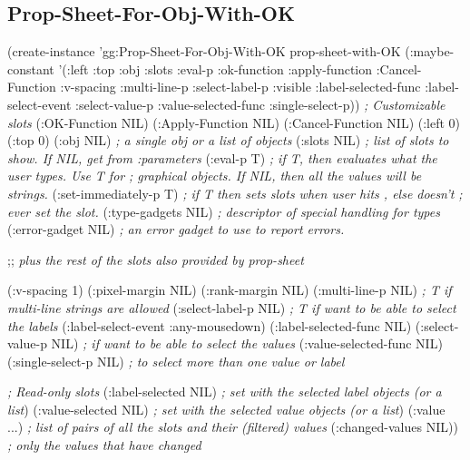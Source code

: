 \begin{group}
\subsection{Prop-Sheet-For-Obj-With-OK}
\label{propsheetforobjwithok}

\begin{programexample}
(create-instance 'gg:Prop-Sheet-For-Obj-With-OK prop-sheet-with-OK
    (:maybe-constant '(:left :top :obj :slots :eval-p :ok-function
		       :apply-function :Cancel-Function :v-spacing
		       :multi-line-p :select-label-p :visible
		       :label-selected-func :label-select-event
		       :select-value-p :value-selected-func :single-select-p))
   {\it ; Customizable slots}
    (:OK-Function NIL)
    (:Apply-Function NIL)
    (:Cancel-Function NIL)
    (:left 0) (:top 0)
    (:obj NIL)   {\it ; a single obj or a list of objects}
    (:slots NIL) {\it ; list of slots to show. If NIL, get from :parameters}
    (:eval-p T)  {\it ; if T, then evaluates what the user types.  Use T for}
		 {\it ; graphical objects.  If NIL, then all the values will be strings.}
    (:set-immediately-p T) {\it ; if T then sets slots when user hits , else doesn't}
			   {\it ; ever set the slot.}
    (:type-gadgets NIL) {\it ; descriptor of special handling for types}
    (:error-gadget NIL) {\it ; an error gadget to use to report errors.}

    ;; {\it plus the rest of the slots also provided by prop-sheet}

    (:v-spacing 1)
    (:pixel-margin NIL)
    (:rank-margin NIL)
    (:multi-line-p NIL)   {\it ; T if multi-line strings are allowed}
    (:select-label-p NIL) {\it ; T if want to be able to select the labels}
    (:label-select-event :any-mousedown)
    (:label-selected-func NIL)
    (:select-value-p NIL) {\it ; if want to be able to select the values}
    (:value-selected-func NIL)
    (:single-select-p NIL) {\it ; to select more than one value or label}

   {\it ; Read-only slots}
    (:label-selected NIL) {\it ; set with the selected label objects (or a list})
    (:value-selected NIL) {\it ; set with the selected value objects (or a list})
    (:value ...)  {\it ; list of pairs of all the slots and their (filtered) values}
    (:changed-values NIL)) {\it ; only the values that have changed}

\end{programexample}
\end{group}

